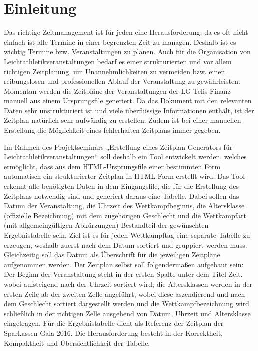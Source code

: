 
\chapter{Einleitung}
\label{chap:Einleitung}

Das richtige Zeitmanagement ist für jeden eine Herausforderung, da es oft nicht einfach ist alle Termine in einer begrenzten Zeit zu managen. Deshalb ist es wichtig Termine bzw. Veranstaltungen zu planen. Auch für die Organisation von Leichtathletikveranstaltungen bedarf es einer strukturierten und vor allem richtigen Zeitplanung, um Unannehmlichkeiten zu vermeiden bzw. einen reibungslosen und professionellen Ablauf der Veranstaltung zu gewährleisten. Momentan werden die Zeitpläne der Veranstaltungen der LG Telis Finanz manuell aus einem Ursprungsfile generiert. Da das Dokument mit den relevanten Daten sehr unstrukturiert ist und viele überflüssige Informationen enthält, ist der Zeitplan natürlich sehr aufwändig zu erstellen. Zudem ist bei einer manuellen Erstellung die Möglichkeit eines fehlerhaften Zeitplans immer gegeben.

Im Rahmen des Projektseminars „Erstellung eines Zeitplan-Generators für Leichtathletikveranstaltungen“ soll deshalb ein Tool entwickelt werden, welches ermöglicht, dass aus dem \ac{HTML}-Ursprungsfile einer bestimmten Form automatisch ein strukturierter Zeitplan in HTML-Form erstellt wird. Das Tool erkennt alle benötigten Daten in dem Eingangsfile, die für die Erstellung des Zeitplans notwendig sind und generiert daraus eine Tabelle. Dabei sollen das Datum der Veranstaltung, die Uhrzeit des Wettkampfbeginns, die Altersklasse (offizielle Bezeichnung) mit dem zugehörigen Geschlecht und die Wettkampfart (mit allgemeingültigen Abkürzungen) Bestandteil der gewünschten Ergebnistabelle sein. Ziel ist es für jeden Wettkampftag eine separate Tabelle zu erzeugen, weshalb zuerst nach dem Datum sortiert und gruppiert werden muss. Gleichzeitig soll das Datum als Überschrift für die jeweiligen Zeitpläne aufgenommen werden. Der Zeitplan selbst soll folgendermaßen aufgebaut sein: Der Beginn der Veranstaltung steht in der ersten Spalte unter dem Titel Zeit, wobei aufsteigend nach der Uhrzeit sortiert wird; die Altersklassen werden in der ersten Zeile ab der zweiten Zelle angeführt, wobei diese aszendierend und nach dem Geschlecht sortiert dargestellt werden und die Wettkampfbezeichnung wird schließlich in der richtigen Zelle ausgehend von Datum, Uhrzeit und Altersklasse eingetragen. Für die Ergebnistabelle dient als Referenz der Zeitplan der Sparkassen Gala 2016.
Die Herausforderung besteht in der Korrektheit, Kompaktheit und Übersichtlichkeit der Tabelle.

